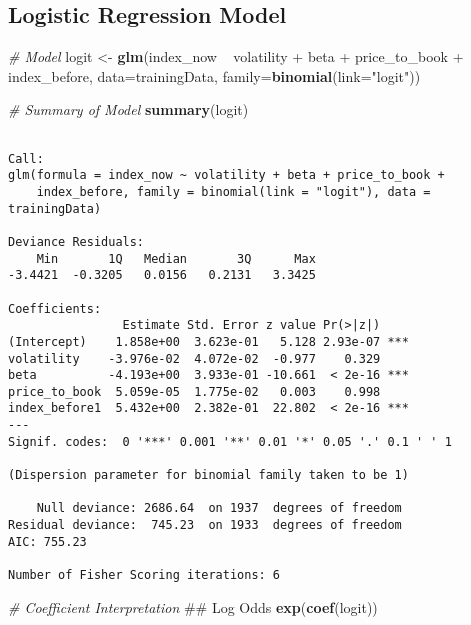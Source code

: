 \documentclass[12pt,twoside]{reedthesis}
\newenvironment{Shaded}{\begin{snugshade}}{\end{snugshade}}
\newcommand{\KeywordTok}[1]{\textcolor[rgb]{0.13,0.29,0.53}{\textbf{{#1}}}}
\newcommand{\DataTypeTok}[1]{\textcolor[rgb]{0.13,0.29,0.53}{{#1}}}
\newcommand{\StringTok}[1]{\textcolor[rgb]{0.31,0.60,0.02}{{#1}}}
\newcommand{\CommentTok}[1]{\textcolor[rgb]{0.56,0.35,0.01}{\textit{{#1}}}}
\newcommand{\NormalTok}[1]{{#1}}
\theoremstyle{definition}
\theoremstyle{definition}
\theoremstyle{definition}
\theoremstyle{remark}
\begin{document}
\subsection{Logistic Regression
Model}\label{logistic-regression-model-1}
\begin{Shaded}
\begin{Highlighting}[]
\CommentTok{# Model}
\NormalTok{logit <-}\StringTok{ }\KeywordTok{glm}\NormalTok{(index_now ~}\StringTok{  }\NormalTok{volatility +}\StringTok{ }\NormalTok{beta +}\StringTok{ }\NormalTok{price_to_book }
\NormalTok{+}\StringTok{ }\NormalTok{index_before, }\DataTypeTok{data=}\NormalTok{trainingData, }\DataTypeTok{family=}\KeywordTok{binomial}\NormalTok{(}\DataTypeTok{link=}\StringTok{"logit"}\NormalTok{))}

\CommentTok{# Summary of Model}
\KeywordTok{summary}\NormalTok{(logit)}
\end{Highlighting}
\end{Shaded}
\begin{verbatim}

Call:
glm(formula = index_now ~ volatility + beta + price_to_book + 
    index_before, family = binomial(link = "logit"), data = trainingData)

Deviance Residuals: 
    Min       1Q   Median       3Q      Max  
-3.4421  -0.3205   0.0156   0.2131   3.3425  

Coefficients:
                Estimate Std. Error z value Pr(>|z|)    
(Intercept)    1.858e+00  3.623e-01   5.128 2.93e-07 ***
volatility    -3.976e-02  4.072e-02  -0.977    0.329    
beta          -4.193e+00  3.933e-01 -10.661  < 2e-16 ***
price_to_book  5.059e-05  1.775e-02   0.003    0.998    
index_before1  5.432e+00  2.382e-01  22.802  < 2e-16 ***
---
Signif. codes:  0 '***' 0.001 '**' 0.01 '*' 0.05 '.' 0.1 ' ' 1

(Dispersion parameter for binomial family taken to be 1)

    Null deviance: 2686.64  on 1937  degrees of freedom
Residual deviance:  745.23  on 1933  degrees of freedom
AIC: 755.23

Number of Fisher Scoring iterations: 6
\end{verbatim}
\begin{Shaded}
\begin{Highlighting}[]
\CommentTok{# Coefficient Interpretation}
\NormalTok{## Log Odds}
\KeywordTok{exp}\NormalTok{(}\KeywordTok{coef}\NormalTok{(logit))}
\end{Highlighting}
\end{Shaded}
\end{document}
